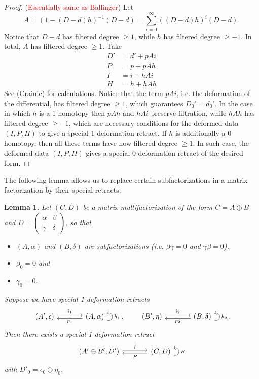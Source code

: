 \documentclass{article}
\newcommand{\sdr}[5]{%
  \begin{tikzcd}[column sep=large, ampersand replacement=\&]
    {#1} \arrow[r, "#3", shift left=0.5ex,] \arrow[r, leftarrow, "#4", shift right=0.5ex, swap] \& 
    {#2} \arrow[loop right, distance=1em, in=15, out=-15, "#5",swap]
  \end{tikzcd}%
}
\theoremstyle{plain} %
\newtheorem{lemma}[theorem]{Lemma}
\theoremstyle{definition} %
\theoremstyle{remark} %
\begin{document}
\begin{proof}(\textcolor{red}{Essentially same as Ballinger}) Let 
	$$A=(1-(D-d)h)^{-1}(D-d)=\sum_{i=0}^{\infty} ((D-d)h)^i(D-d). $$
	Notice that $D-d$ has filtered degree $\geq 1$, while $h$ has filtered degree $\geq -1$. In total, $A$ has filtered degree $\geq 1$.
	Take 
	\begin{equation}\label{eq:deformedsdrdata}
		\begin{aligned}
			D'&=d'+pAi
			\\
			P&=p+pAh
			\\
			I&=i+hAi
			\\
			H&=h+hAh
		\end{aligned}
	\end{equation}See (Crainic) for calculations. Notice that the term $pAi$, i.e. the deformation of the differential, has filtered degree $\geq 1$, which guarantees $D_0'=d_0'$. In the case in which $h$ is a 1-homotopy then $pAh$ and $hAi$ preserve filtration, while $hAh$ has filtered degree $\geq -1$, which are necessary conditions for the deformed data $(I,P,H)$ to give a special 1-deformation retract. If $h$ is additionally a 0-homotopy, then all these terms have now filtered degree $\geq 1$. In such case, the deformed data $(I,P,H)$ gives a special 0-deformation retract of the desired form.
\end{proof}

The following lemma allows us to replace certain subfactorizations in a matrix factorization by their special retracts.

\begin{lemma}\label{SummandLemma}
	Let $(C,D)$ be a matrix multifactorization of the form $C=A\oplus B$ and 
	$D=\begin{pmatrix}\alpha & \beta \\ \gamma & \delta \end{pmatrix}$, so that \begin{itemize}
		\item $(A,\alpha)$ and $(B,\delta)$ are subfactorizations (i.e. $\beta\gamma=0$ and $\gamma\beta=0$), 
		\item $\beta_0=0$  and
		\item $\gamma_0=0$.
	\end{itemize}
Suppose we have special 1-deformation retracts 
$$
\sdr{(A',\epsilon)}{(A,\alpha)}{i_1}{p_1}{h_1}
,\qquad
\sdr{(B',\eta)}{(B,\delta)}{i_2}{p_2}{h_2}
.
$$ 
Then there exists a special 1-deformation retract
	$$
	\sdr{(A'\oplus B',D')}{(C,D)}{I}{P}{H}
	$$
	with $D'_0=\epsilon_0\oplus \eta_0$.
	
	
\end{lemma}
\end{document}
